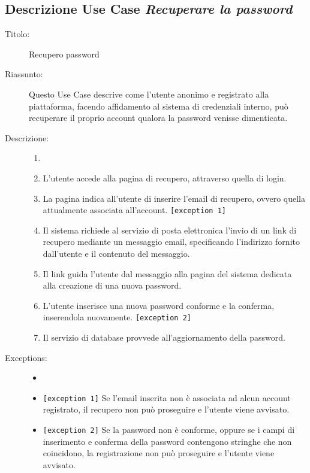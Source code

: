 \documentclass[11pt, a4paper]{article}
\theoremstyle{definition} %
\begin{document}
\subsection*{Descrizione Use Case \textit{Recuperare la password}}
\begin{description}
    \item[Titolo:] Recupero password
    
    \item[Riassunto:] Questo Use Case descrive come l'utente anonimo e
    registrato alla piattaforma, facendo affidamento al sistema di credenziali
    interno, può recuperare il proprio account qualora la password venisse dimenticata.

    \item[Descrizione:]
    \begin{enumerate}
        \item[]
        \item L'utente accede alla pagina di recupero, attraverso quella di login.
        \item La pagina indica all'utente di inserire l'email di recupero, ovvero quella attualmente associata all'account. \verb|[exception 1]|
        \item Il sistema richiede al servizio di posta elettronica l'invio di un link di recupero mediante un messaggio email, specificando l'indirizzo fornito dall'utente e il contenuto del messaggio.
        \item Il link guida l'utente dal messaggio alla pagina del sistema dedicata alla creazione di una nuova password.
        \item L'utente inserisce una nuova password conforme e la conferma, inserendola nuovamente. \verb|[exception 2]|
        \item Il servizio di database provvede all'aggiornamento della password.
    \end{enumerate}
    
    \item[Exceptions:]
    \begin{itemize}
        \item[]
        \item \verb|[exception 1]| Se l'email inserita non è associata ad alcun account registrato, il recupero non può proseguire e l'utente viene avvisato.
        \item \verb|[exception 2]| Se la password non è conforme, oppure se i campi di inserimento e conferma della password contengono stringhe che non coincidono, la registrazione non può proseguire e l'utente viene avvisato.
    \end{itemize}
    
\end{description}
\end{document}
